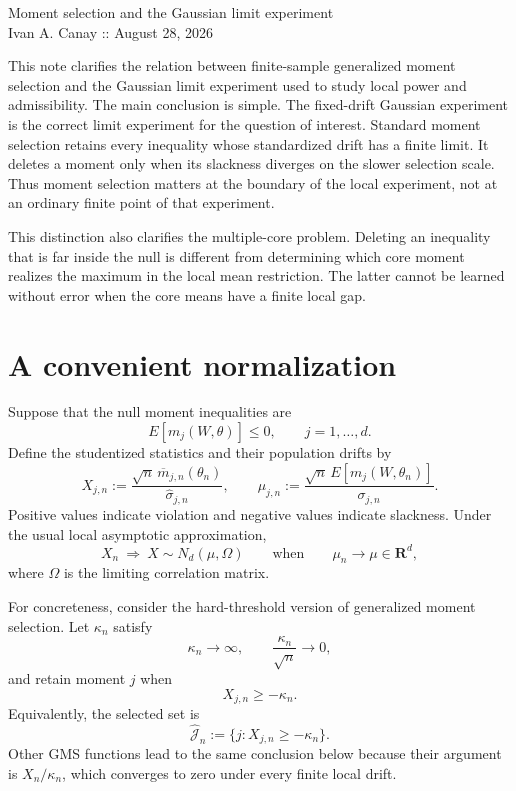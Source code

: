 \documentclass[12pt]{article}
\theoremstyle{remark}
\begin{document}
\begin{center}
{\Large Moment selection and the Gaussian limit experiment}\\[3pt]
{\small Ivan A. Canay :: August 28, 2026}
\end{center}

\medskip

This note clarifies the relation between finite-sample generalized moment
selection and the Gaussian limit experiment used to study local power and
admissibility.  The main conclusion is simple.  The fixed-drift Gaussian
experiment is the correct limit experiment for the question of interest.
Standard moment selection retains every inequality whose standardized drift
has a finite limit.  It deletes a moment only when its slackness diverges on
the slower selection scale.  Thus moment selection matters at the boundary of
the local experiment, not at an ordinary finite point of that experiment.

This distinction also clarifies the multiple-core problem.  Deleting an
inequality that is far inside the null is different from determining which
core moment realizes the maximum in the local mean restriction.  The latter
cannot be learned without error when the core means have a finite local gap.

\section{A convenient normalization}

Suppose that the null moment inequalities are
\[
E[m_j(W,\theta)]\le 0,
\qquad j=1,\ldots,d.
\]
Define the studentized statistics and their population drifts by
\[
X_{j,n}
:=
\frac{\sqrt n\,\overline m_{j,n}(\theta_n)}
     {\widehat\sigma_{j,n}},
\qquad
\mu_{j,n}
:=
\frac{\sqrt n\,E[m_j(W,\theta_n)]}
     {\sigma_{j,n}}.
\]
Positive values indicate violation and negative values indicate slackness.
Under the usual local asymptotic approximation,
\begin{equation}\label{eq:gaussian-limit}
X_n\ \Rightarrow\ X\sim N_d(\mu,\Omega)
\qquad\text{when}\qquad
\mu_n\to\mu\in\mathbf R^d,
\end{equation}
where $\Omega$ is the limiting correlation matrix.

For concreteness, consider the hard-threshold version of generalized moment
selection.  Let $\kappa_n$ satisfy
\begin{equation}\label{eq:kappa}
\kappa_n\to\infty,
\qquad
\frac{\kappa_n}{\sqrt n}\to0,
\end{equation}
and retain moment $j$ when
\[
X_{j,n}\ge-\kappa_n.
\]
Equivalently, the selected set is
\begin{equation}\label{eq:selected-set}
\widehat{\mathcal J}_n
:=
\{j:X_{j,n}\ge-\kappa_n\}.
\end{equation}
Other GMS functions lead to the same conclusion below because their argument
is $X_n/\kappa_n$, which converges to zero under every finite local drift.
\end{document}
